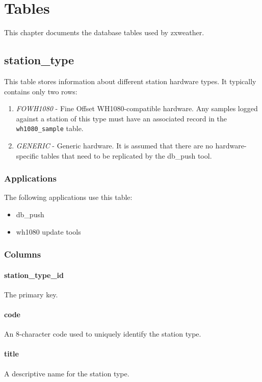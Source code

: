 \documentclass[a4paper,10pt]{book}
\begin{document}
\chapter{Tables}
\label{cha_tables}

This chapter documents the database tables used by zxweather.

\section{station\_type}
\label{tbl_station_type}
This table stores information about different station hardware types. It typically contains only two rows:
\begin{enumerate}
\item \emph{FOWH1080} - Fine Offset WH1080-compatible hardware. Any samples logged against a station of this type must have an associated record in the \verb|wh1080_sample| table.
\item \emph{GENERIC} - Generic hardware. It is assumed that there are no hardware-specific tables that need to be replicated by the db\_push tool.
\end{enumerate}

\subsection{Applications}
The following applications use this table:
\begin{itemize}
\item db\_push
\item wh1080 update tools
\end{itemize}

\subsection{Columns}

\subsubsection{station\_type\_id}
The primary key.

\subsubsection{code}
An 8-character code used to uniquely identify the station type.

\subsubsection{title}
A descriptive name for the station type.
 
\end{document}
